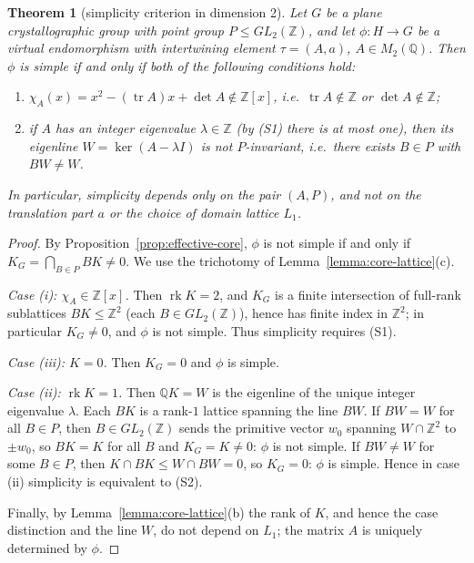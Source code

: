 \documentclass[12pt]{article}
\newtheorem{theorem}{Theorem}
\theoremstyle{definition}
\begin{document}
\begin{theorem}[simplicity criterion in dimension
2]\label{thm:simplicity-dim2}
Let $G$ be a plane crystallographic group with point group
$P\le GL_2(\mathbb{Z})$, and let $\phi:H\rightarrow G$ be a virtual
endomorphism with intertwining element $\tau=(A,a)$, $A\in
M_2(\mathbb{Q})$. Then $\phi$ is simple if and only if both of the
following conditions hold:
\begin{enumerate}
\item[\emph{(S1)}] $\chi_A(x)=x^2-(\operatorname{tr}A)x+\det A
\notin\mathbb{Z}[x]$, i.e.\ $\operatorname{tr}A\notin\mathbb{Z}$ or
$\det A\notin\mathbb{Z}$;
\item[\emph{(S2)}] if $A$ has an integer eigenvalue $\lambda\in\mathbb{Z}$
(by \emph{(S1)} there is at most one), then its eigenline
$W=\ker(A-\lambda I)$ is not $P$-invariant, i.e.\ there exists $B\in P$
with $BW\ne W$.
\end{enumerate}
In particular, simplicity depends only on the pair $(A,P)$, and not on
the translation part $a$ or the choice of domain lattice $L_1$.
\end{theorem}
\begin{proof}
By Proposition~\ref{prop:effective-core}, $\phi$ is not simple if and
only if $K_G=\bigcap_{B\in P}BK\ne0$. We use the trichotomy of
Lemma~\ref{lemma:core-lattice}(c).

\emph{Case (i): $\chi_A\in\mathbb{Z}[x]$.} Then $\operatorname{rk}K=2$,
and $K_G$ is a finite intersection of full-rank sublattices
$BK\le\mathbb{Z}^2$ (each $B\in GL_2(\mathbb{Z})$), hence has finite
index in $\mathbb{Z}^2$; in particular $K_G\ne0$, and $\phi$ is not
simple. Thus simplicity requires (S1).

\emph{Case (iii): $K=0$.} Then $K_G=0$ and $\phi$ is simple.

\emph{Case (ii): $\operatorname{rk}K=1$.} Then $\mathbb{Q}K=W$ is the
eigenline of the unique integer eigenvalue $\lambda$. Each $BK$ is a
rank-$1$ lattice spanning the line $BW$. If $BW=W$ for all $B\in P$,
then $B\in GL_2(\mathbb{Z})$ sends the primitive vector $w_0$ spanning
$W\cap\mathbb{Z}^2$ to $\pm w_0$, so $BK=K$ for all $B$ and
$K_G=K\ne0$: $\phi$ is not simple. If $BW\ne W$ for some $B\in P$, then
$K\cap BK\le W\cap BW=0$, so $K_G=0$: $\phi$ is simple. Hence in case
(ii) simplicity is equivalent to (S2).

Finally, by Lemma~\ref{lemma:core-lattice}(b) the rank of $K$, and hence
the case distinction and the line $W$, do not depend on $L_1$; the
matrix $A$ is uniquely determined by $\phi$.
\end{proof}
\end{document}
